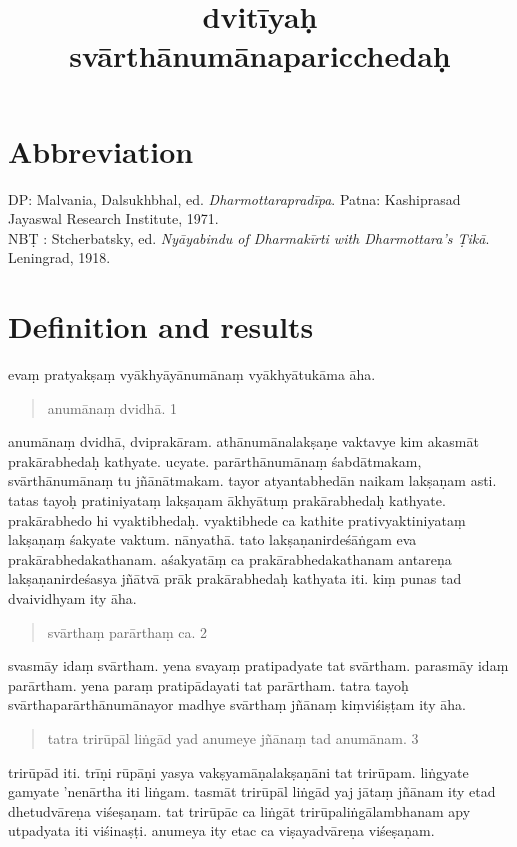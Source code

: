 \documentclass{article}
\title{dvitīyaḥ svārthānumānaparicchedaḥ}
\author{}
\date{}
\begin{document}
\maketitle
\section*{Abbreviation}
DP: Malvania, Dalsukhbhal, ed. \textit{Dharmottarapradīpa}. Patna: Kashiprasad Jayaswal Research Institute, 1971.\\
NB\d{T} : Stcherbatsky, ed. \textit{Nyāyabindu of Dharmakīrti with Dharmottara's Ṭikā}. Leningrad, 1918.
\baselineskip
\beginnumbering

\section{Definition and results}
\pstart
{}evaṃ pratyakṣaṃ vyākhyāyānumānaṃ vyākhyātukāma āha. 
\pend
\pstart
 \begin{quote}
 anumānaṃ dvidhā. 1 
 \end{quote}
 \pend
 \pstart 
anumānaṃ dvidhā, dviprakāram. athānumānalakṣaṇe vaktavye kim akasmāt prakārabhedaḥ kathyate. ucyate. parārthānumānaṃ śabdātmakam, svārthānumānaṃ tu jñānātmakam. tayor atyantabhedān naikam lakṣaṇam asti. tatas tayoḥ pratiniyataṃ lakṣaṇam ākhyātuṃ prakārabhedaḥ kathyate. prakārabhedo hi vyaktibhedaḥ. vyaktibhede ca kathite prativyaktiniyataṃ lakṣaṇaṃ śakyate vaktum. nānyathā. tato lakṣaṇanirdeśāṅgam eva prakārabhedakathanam. aśakyatāṃ ca prakārabhedakathanam antareṇa lakṣaṇanirdeśasya jñātvā prāk prakārabhedaḥ kathyata iti.
\pend
\pstart
{}kiṃ punas tad dvaividhyam ity āha. 
\pend
\pstart
\begin{quote}
svārthaṃ parārthaṃ ca. 2
\end{quote}
\pend
\pstart
svasmāy idaṃ svārtham. yena svayaṃ pratipadyate tat svārtham. parasmāy idaṃ parārtham. yena paraṃ pratipādayati tat parārtham.
\pend
\pstart
tatra tayoḥ svārthaparārthānumānayor madhye svārthaṃ jñānaṃ kiṃviśiṣṭam ity āha. 
\pend
\pstart
\begin{quote}
tatra trirūpāl liṅgād yad anumeye jñānaṃ tad anumānam. 3
\end{quote}
\pend
\pstart
trirūpād iti. trīṇi rūpāṇi yasya vakṣyamāṇalakṣaṇāni tat trirūpam. liṅgyate gamyate 'nenārtha iti liṅgam. tasmāt trirūpāl liṅgād yaj jātaṃ jñānam ity etad dhetudvāreṇa viśeṣaṇam. tat trirūpāc ca liṅgāt trirūpaliṅgālambhanam apy utpadyata iti viśinaṣṭi. anumeya ity etac ca viṣayadvāreṇa viśeṣaṇam.
\end{document}
